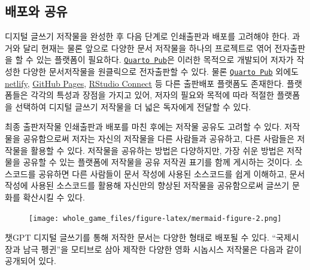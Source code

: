 \documentclass[
  letterpaper,
]{book}
\begin{document}
\begin{figure}
\begin{minipage}[t]{0.50\linewidth}
{{}

}

\end{minipage}%

\end{figure}

\hypertarget{uxbc30uxd3ecuxc640-uxacf5uxc720}{%
\subsection{배포와 공유}\label{uxbc30uxd3ecuxc640-uxacf5uxc720}}

디지털 글쓰기 저작물을 완성한 후 다음 단계로 인쇄출판과 배포를 고려해야
한다. 과거와 달리 현재는 물론 앞으로 다양한 문서 저작물을 하나의
프로젝트로 엮어 전자출판을 할 수 있는 플랫폼이 필요하다.
\href{https://quartopub.com/}{\texttt{Quarto\ Pub}}은 이러한 목적으로
개발되어 저자가 작성한 다양한 문서저작물을 원클릭으로 전자출판할 수
있다. 물론 \href{https://quartopub.com/}{\texttt{Quarto\ Pub}} 외에도
\href{https://netlify.com/}{netlify}, \href{https://github.com/}{GitHub
Pages}, \href{https://www.rstudio.com/products/connect/}{RStudio
Connect} 등 다른 출판배포 플랫폼도 존재한다. 플랫폼들은 각각의 특성과
장점을 가지고 있어, 저자의 필요와 목적에 따라 적절한 플랫폼을 선택하여
디지털 글쓰기 저작물을 더 넓은 독자에게 전달할 수 있다.

최종 출판저작물 인쇄출판과 배포를 마친 후에는 저작물 공유도 고려할 수
있다. 저작물을 공유함으로써 저자는 자신의 저작물을 다른 사람들과
공유하고, 다른 사람들은 저작물을 활용할 수 있다. 저작물을 공유하는
방법은 다양하지만, 가장 쉬운 방법은 저작물을 공유할 수 있는 플랫폼에
저작물을 공유 저작권 표기를 함께 게시하는 것이다. 소스코드를 공유하면
다른 사람들이 문서 작성에 사용된 소스코드를 쉽게 이해하고, 문서 작성에
사용된 소스코드를 활용해 자신만의 향상된 저작물을 공유함으로써 글쓰기
문화를 확산시킬 수 있다.

\begin{figure}[H]

{\centering \texttt{[image: whole\_game\_files/figure-latex/mermaid-figure-2.png]}

}

\end{figure}

챗GPT 디지털 글쓰기를 통해 저작한 문서는 다양한 형태로 배포될 수 있다.
``국제시장과 남극 펭귄''을 모티브로 삼아 제작한 다양한 영화 시놉시스
저작물은 다음과 같이 공개되어 있다.
\end{document}
